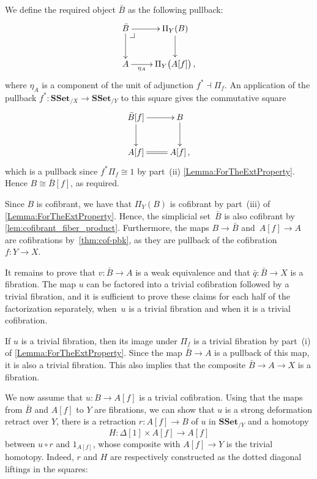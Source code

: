 \documentclass[reqno,10pt,a4paper,oneside]{amsart}
\makeatletter
\renewenvironment{proof}[1][\proofname] {\par\pushQED{\qed}\normalfont\topsep6\p@\@plus6\p@\relax\trivlist\item[\hskip\labelsep\bf#1\@addpunct{.}]\ignorespaces}{\popQED\endtrivlist\@endpefalse}
\numberwithin{equation}{section}
\theoremstyle{mythm}
\theoremstyle{mydef}
\theoremstyle{myrmk}
\newcommand{\pullback}[1]{\save*!/#1-1.2pc/#1:(-1,1)@^{|-}\restore}
\newcommand{\drpullback}{\pullback{dr}}
\newcommand{\ie}{\text{i.e.\ }}
\newcommand{\co}{\colon}
\newcommand{\iso}{\cong}
\newcommand{\SSet}{\mathbf{SSet}}
\makeatother
\begin{document}
\begin{proof} We define the required object $\bar{B}$ as the following pullback:
\[\xymatrix{
\bar{B} \ar[d] \ar[r] \drpullback & \Pi_Y(B) \ar[d] \\
A \ar[r]_-{\eta_{A}} & \Pi_Y \big( A[f]  \big) \, ,
}\]
where $\eta_{A}$ is  a component of the unit of adjunction  $f^* \dashv \Pi_f$. An application of the pullback $f^* \co \SSet_{/X} \to \SSet_{/Y}$ to this square gives the commutative square
\[\xymatrix{
\bar{B}[f] \ar[d] \ar[r]  & B \ar[d] \\
A[f] \ar@{=}[r] &A[f] \, ,
}\]
which is a pullback since $f^* \Pi_f \iso 1$ by part~(ii) \cref{Lemma:ForTheExtProperty}. Hence 
$B \iso \bar{B}[f]$, as required.


Since $B$ is cofibrant, we have that $\Pi_Y(B)$ is cofibrant by part~(iii) of  \cref{Lemma:ForTheExtProperty}. Hence, the simplicial set~$\bar{B}$  is also cofibrant by \cref{lem:cofibrant_fiber_product}. Furthermore, the maps $B \rightarrow \bar{B}$ and~$A[f] \rightarrow A$ are cofibrations by~\cref{thm:cof-pbk}, as they are pullback of the cofibration~$f \co Y \rightarrow X$.





It remains to prove that $v \co \bar{B} \rightarrow A$ is a weak equivalence and that $\bar{q} \co \bar{B} \rightarrow X$ is a fibration. The map $u$ can be factored into a trivial cofibration followed by a trivial fibration, and it is sufficient to prove these claims for each half of the factorization separately, \ie when~$u$ is a trivial fibration and when it is a trivial cofibration.

If $u$ is a trivial fibration, then its image under $\Pi_f$ is a trivial fibration by 
part~(i) of \cref{Lemma:ForTheExtProperty}. Since the map $\bar{B} \rightarrow A$ is a pullback of this map,
it is also a trivial fibration. This also implies that the composite $\bar{B} \rightarrow A \rightarrow X$ is a fibration.


We now assume that $u \co B \rightarrow A[f]$ is a trivial cofibration. Using that the maps from $\bar{B}$ and $A[f]$ to $Y$ are fibrations, we can show that $u$ is a strong deformation retract over $Y$, \ie there is a retraction $r \co A[f] \rightarrow B$ of $u$ in $\SSet_{/Y}$ and a homotopy 
\[
H \co \Delta[1] \times A[f] \rightarrow A[f]
\] 
between 
$u \circ r$ and $1_{A[f]}$, whose composite with $A[f] \rightarrow Y$ is the trivial homotopy. Indeed, $r$ and  $H$ are respectively constructed as the dotted diagonal liftings in the squares:


\end{proof}
\end{document}
